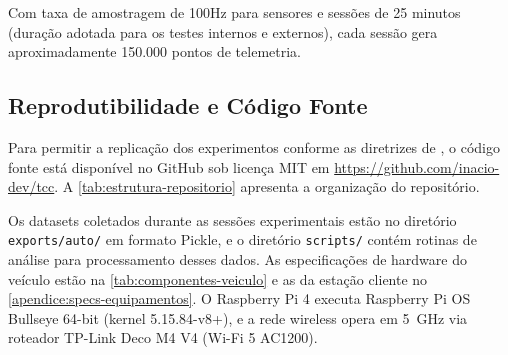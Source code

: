 Com taxa de amostragem de 100Hz para sensores e sessões de 25 minutos (duração adotada para os testes internos e externos), cada sessão gera aproximadamente 150.000 pontos de telemetria.

\subsection{Reprodutibilidade e Código Fonte}
\label{subsec:reprodutibilidade-codigo}

Para permitir a replicação dos experimentos conforme as diretrizes de , o código fonte está disponível no GitHub sob licença MIT em \url{https://github.com/inacio-dev/tcc}. A \autoref{tab:estrutura-repositorio} apresenta a organização do repositório.

\begin{table}[!h]
\captionsetup{width=16cm}
\end{table}

Os datasets coletados durante as sessões experimentais estão no diretório \texttt{exports/auto/} em formato Pickle, e o diretório \texttt{scripts/} contém rotinas de análise para processamento desses dados. As especificações de hardware do veículo estão na \autoref{tab:componentes-veiculo} e as da estação cliente no \autoref{apendice:specs-equipamentos}. O Raspberry Pi 4 executa Raspberry Pi OS Bullseye 64-bit (kernel 5.15.84-v8+), e a rede wireless opera em 5~GHz via roteador TP-Link Deco M4 V4 (Wi-Fi 5 AC1200).

